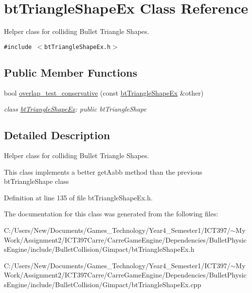 \hypertarget{classbt_triangle_shape_ex}{
\section{btTriangleShapeEx Class Reference}
\label{classbt_triangle_shape_ex}
}
Helper class for colliding Bullet Triangle Shapes.  


{\tt \#include $<$btTriangleShapeEx.h$>$}

\subsection*{Public Member Functions}
\begin{CompactItemize}
\item 
\hypertarget{classbt_triangle_shape_ex_8642843da440361eecf27d5a074d6231}{
bool \hyperlink{classbt_triangle_shape_ex_8642843da440361eecf27d5a074d6231}{overlap\_\-test\_\-conservative} (const \hyperlink{classbt_triangle_shape_ex}{btTriangleShapeEx} \&other)}
\label{classbt_triangle_shape_ex_8642843da440361eecf27d5a074d6231}

\begin{CompactList}\small\item\em class \hyperlink{classbt_triangle_shape_ex}{btTriangleShapeEx}: public btTriangleShape \item\end{CompactList}\end{CompactItemize}


\subsection{Detailed Description}
Helper class for colliding Bullet Triangle Shapes. 

This class implements a better getAabb method than the previous btTriangleShape class 

Definition at line 135 of file btTriangleShapeEx.h.

The documentation for this class was generated from the following files:\begin{CompactItemize}
\item 
C:/Users/New/Documents/Games\_\-Technology/Year4\_\-Semester1/ICT397/$\sim$My Work/Assignment2/ICT397Carre/CarreGameEngine/Dependencies/BulletPhysicsEngine/include/BulletCollision/Gimpact/btTriangleShapeEx.h\item 
C:/Users/New/Documents/Games\_\-Technology/Year4\_\-Semester1/ICT397/$\sim$My Work/Assignment2/ICT397Carre/CarreGameEngine/Dependencies/BulletPhysicsEngine/include/BulletCollision/Gimpact/btTriangleShapeEx.cpp\end{CompactItemize}
